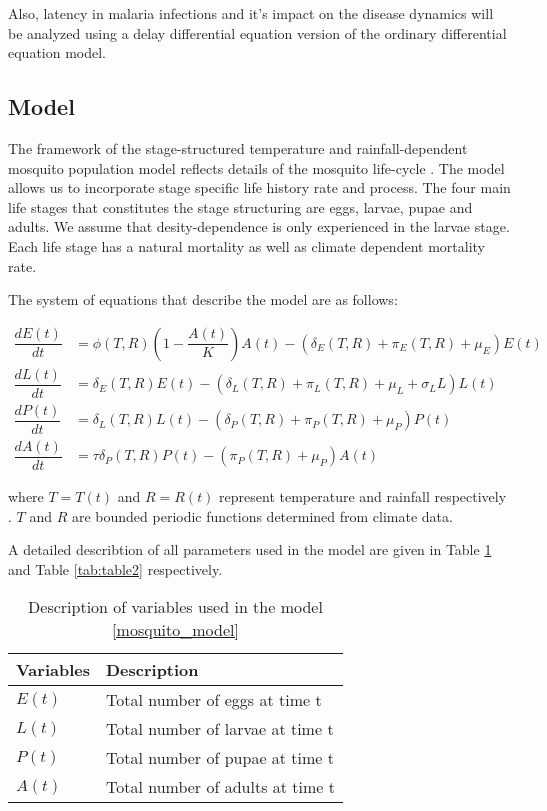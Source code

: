 \documentclass[12pt,a4paper,titlepage]{article}
\begin{document}
Also, latency in malaria infections and it's impact on the disease dynamics will be analyzed using a delay differential equation version of the ordinary differential equation model.


\subsection{Model}
The framework of the stage-structured temperature and rainfall-dependent mosquito population model reflects details of the mosquito life-cycle \cite{abdelrazec2017mathematical, hamdan2020effect, beck2013effect}. The model allows us to incorporate stage specific life history rate and process. The four main life stages that constitutes the stage structuring are eggs, larvae, pupae and adults. We assume that desity-dependence is only experienced in the larvae stage. Each life stage has a natural mortality as well as climate dependent mortality rate.  

The system of equations that describe the model are as follows:


\begin{subequations}
	\label{mosquito_model}
	\begin{align}
\dfrac{dE(t)}{dt} &= \phi (T, R)\left(1-\dfrac{A(t)}{K}\right)A(t) - \left( \delta_E(T, R)  + \pi_E(T, R)+ \mu_E\right)E(t)\\
\dfrac{dL(t)}{dt} &= \delta_E(T, R)E(t) - \left( \delta_L(T, R)  + \pi_L(T, R)+ \mu_L + \sigma_L L\right)L(t)\\
\dfrac{dP(t)}{dt} &= \delta_L(T, R)L(t) - \left( \delta_P(T, R)  + \pi_P(T, R)+ \mu_P \right)P(t)\\
\dfrac{dA(t)}{dt} &= \tau \delta_P(T, R)P(t) - \left( \pi_P(T, R)+ \mu_P \right)A(t)
	\end{align}
\end{subequations}

where $T = T(t)$ and $R=R(t)$ represent temperature and rainfall respectively \cite{abdelrazec2017mathematical}. $T$ and $R$ are bounded periodic functions determined from climate data.

A detailed describtion of all parameters used in the model are given in Table \ref{tab:table1} and Table \ref{tab:table2} respectively. 

\begin{table}[h!]
	\begin{center}
		\caption{Description of variables used in the model \ref{mosquito_model}}
		\label{tab:table1}
		\begin{tabular}{l|l} %
			\hline
			\textbf{Variables} & \textbf{Description} \\
			\hline
			$E(t)$ & Total number of eggs at  time t \\
			$L(t)$ & Total number of larvae at  time t \\
			$P(t)$ & Total number of pupae at  time t \\
			$A(t)$ & Total number of adults at  time t
			
		\end{tabular}
	\end{center}
\end{table}
\end{document}
